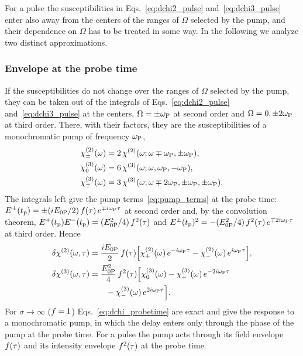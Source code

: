 \documentclass[aps,prb,reprint,superscriptaddress,amsmath,amssymb]{revtex4-2}
\begin{document}
For a pulse the susceptibilities in Eqs.~\eqref{eq:dchi2_pulse} and~\eqref{eq:dchi3_pulse} enter also away from the
centers of the ranges of $\Omega$ selected by the pump, and their dependence on $\Omega$ has to be treated in some
way. In the following we analyze two distinct approximations.

\subsubsection{Envelope at the probe time}
\label{sec:theory_probetime}

If the susceptibilities do not change over the ranges of $\Omega$ selected by the pump, they can be taken out of the
integrals of Eqs.~\eqref{eq:dchi2_pulse} and~\eqref{eq:dchi3_pulse} at the centers, $\Omega = \pm\omega_{\mathrm{P}}$ at second order
and $\Omega = 0,\pm2\omega_{\mathrm{P}}$ at third order. There, with their factors, they are the susceptibilities of a monochromatic
pump of frequency $\omega_{\mathrm{P}}$,
\begin{align}
\chi^{(2)}_\pm(\omega) &= 2\,\chi^{(2)}(\omega;\omega\mp\omega_{\mathrm{P}},\pm\omega_{\mathrm{P}}) , \nonumber\\
\chi^{(3)}_{0}(\omega) &= 6\,\chi^{(3)}(\omega;\omega,\omega_{\mathrm{P}},-\omega_{\mathrm{P}}) , \nonumber\\
\chi^{(3)}_\pm(\omega) &= 3\,\chi^{(3)}(\omega;\omega\mp2\omega_{\mathrm{P}},\pm\omega_{\mathrm{P}},\pm\omega_{\mathrm{P}}) .
\label{eq:chi_mono}
\end{align}
The integrals left give the pump terms~\eqref{eq:pump_terms} at the probe time: $E^\pm(t_{\mathrm{p}}) = \pm(iE_{0\mathrm{P}}/2)\,f(\tau)\,
e^{\mp i\omega_{\mathrm{P}}\tau}$ at second order and, by the convolution theorem, $E^+(t_{\mathrm{p}})E^-(t_{\mathrm{p}}) = (E_{0\mathrm{P}}^2/4)\,f^2(\tau)$ and
$E^\pm(t_{\mathrm{p}})^2 = -(E_{0\mathrm{P}}^2/4)\,f^2(\tau)\,e^{\mp2i\omega_{\mathrm{P}}\tau}$ at third order. Hence
\begin{align}
\delta\chi^{(2)}(\omega,\tau) &= \frac{iE_{0\mathrm{P}}}{2}\,f(\tau)\Big[\chi^{(2)}_+(\omega)\,e^{-i\omega_{\mathrm{P}}\tau}
- \chi^{(2)}_-(\omega)\,e^{i\omega_{\mathrm{P}}\tau}\Big] , \nonumber\\
\delta\chi^{(3)}(\omega,\tau) &= \frac{E_{0\mathrm{P}}^2}{4}\,f^2(\tau)\Big[\chi^{(3)}_{0}(\omega) - \chi^{(3)}_{+}(\omega)\,e^{-2i\omega_{\mathrm{P}}\tau}
\nonumber\\
&\qquad - \chi^{(3)}_{-}(\omega)\,e^{2i\omega_{\mathrm{P}}\tau}\Big] .
\label{eq:dchi_probetime}
\end{align}
For $\sigma\to\infty$ ($f = 1$) Eqs.~\eqref{eq:dchi_probetime} are exact and give the response to a monochromatic
pump, in which the delay enters only through the phase of the pump at the probe time. For a pulse the pump acts
through its field envelope $f(\tau)$ and its intensity envelope $f^2(\tau)$ at the probe time.
\end{document}
